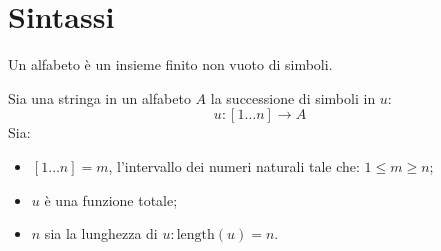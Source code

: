 \chapter{Sintassi}
\begin{theorem}
  Un alfabeto è un insieme finito non vuoto di simboli.
\end{theorem}
\begin{theorem}
  Sia una stringa in un alfabeto $A$ la successione di simboli in $u$:
  \[u:[1\dots n] \rightarrow A\]
  Sia:
  \begin{itemize}
    \item $[1\dots n] = m$, l'intervallo dei numeri naturali tale che: $1\leq m
      \geq n$;
    \item $u$ è una funzione totale;
    \item $n$ sia la lunghezza di $u: \text{length}(u)=n$.
  \end{itemize}
\end{theorem}

